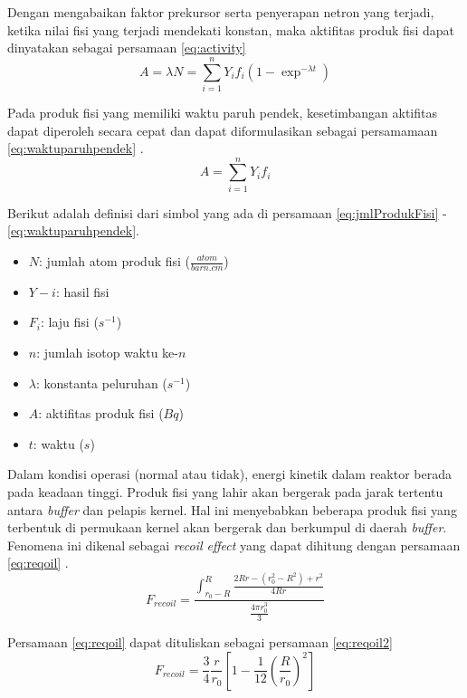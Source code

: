 \documentclass[a4paper,11pt]{report}
\begin{document}
Dengan mengabaikan faktor prekursor serta penyerapan netron yang terjadi, ketika nilai fisi yang terjadi mendekati konstan, maka aktifitas produk fisi dapat dinyatakan sebagai persamaan \ref{eq:activity} \cite{report3}
\begin{equation}
  A=\lambda N = \sum\limits_{i=1}^{n}Y_if_i\left(1-\exp^{-\lambda t} \right)
  \label{eq:activity}
\end{equation}

Pada produk fisi yang memiliki waktu paruh pendek, kesetimbangan aktifitas dapat diperoleh secara cepat dan dapat diformulasikan sebagai persamamaan \ref{eq:waktuparuhpendek} \cite{report2}.
\begin{equation}
  A=\sum\limits_{i=1}^nY_if_i
  \label{eq:waktuparuhpendek}
\end{equation}

Berikut adalah definisi dari simbol yang ada di persamaan \ref{eq:jmlProdukFisi} - \ref{eq:waktuparuhpendek}.
\begin{itemize}
  \item $N$: jumlah atom produk fisi ($\frac{atom}{barn.cm}$)
  \item $Y-i$: hasil fisi
  \item $F_i$: laju fisi ($s^{-1}$)
  \item $n$: jumlah isotop waktu ke-$n$
  \item $\lambda$: konstanta peluruhan ($s^{-1}$)
  \item $A$: aktifitas produk fisi ($Bq$)
  \item $t$: waktu ($s$)
\end{itemize}

Dalam kondisi operasi (normal atau tidak), energi kinetik dalam reaktor berada pada keadaan tinggi. Produk fisi yang lahir akan bergerak pada jarak tertentu antara \textit{buffer} dan pelapis kernel. Hal ini menyebabkan beberapa produk fisi yang terbentuk di permukaan kernel akan bergerak dan berkumpul di daerah \textit{buffer}. Fenomena ini dikenal sebagai \textit{recoil effect} yang dapat dihitung dengan persamaan \ref{eq:reqoil} \cite{report3}.
\begin{equation}
  F_{recoil}=\frac{\int_{r_0-R}^{R}\frac{2Rr-\left(r_0^2-R^2\right)+r^2}{4Rr}}{\frac{4\pi r_0^3}{3}}
  \label{eq:reqoil}
\end{equation} 

Persamaan \ref{eq:reqoil} dapat dituliskan sebagai persamaan \ref{eq:reqoil2} \cite{report3}
\begin{equation}
  F_{recoil}=\frac{3}{4}\frac{r}{r_0}\left[1-\frac{1}{12}\left(\frac{R}{r_0}\right)^2\right]
  \label{eq:reqoil2}
\end{equation}
\end{document}
